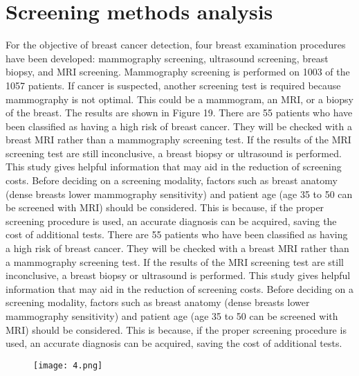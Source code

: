 \documentclass[10pt,a4paper,twoside]{article}
\begin{document}
\section{Screening methods analysis}
For the objective of breast cancer detection, four breast examination procedures have been developed: mammography screening, ultrasound screening, breast biopsy, and MRI screening.
Mammography screening is performed on 1003 of the 1057 patients. If cancer is suspected, another screening test is required because mammography is not optimal. This could be a mammogram, an MRI, or a biopsy of the breast. The results are shown in Figure 19.
\vspace{0.3cm}
There are 55 patients who have been classified as having a high risk of breast cancer. They will be checked with a breast MRI rather than a mammography screening test. If the results of the MRI screening test are still inconclusive, a breast biopsy or ultrasound is performed.
This study gives helpful information that may aid in the reduction of screening costs. Before deciding on a screening modality, factors such as breast anatomy (dense breasts lower mammography sensitivity) and patient age (age 35 to 50 can be screened with MRI) should be considered.
This is because, if the proper screening procedure is used, an accurate diagnosis can be acquired, saving the cost of additional tests.
\vspace{0.3cm}
There are 55 patients who have been classified as having a high risk of breast cancer. They will be checked with a breast MRI rather than a mammography screening test. If the results of the MRI screening test are still inconclusive, a breast biopsy or ultrasound is performed.
This study gives helpful information that may aid in the reduction of screening costs. Before deciding on a screening modality, factors such as breast anatomy (dense breasts lower mammography sensitivity) and patient age (age 35 to 50 can be screened with MRI) should be considered.
This is because, if the proper screening procedure is used, an accurate diagnosis can be acquired, saving the cost of additional tests.
\begin{figure}
  \texttt{[image: 4.png]}
  
  
  
\end{figure}
\end{document}
